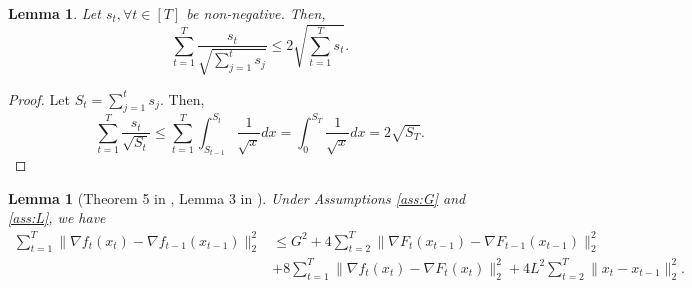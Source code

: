 \documentclass{article}
\renewcommand{\citet}{\citep}
\theoremstyle{plain}
\newtheorem{lemma}[theorem]{Lemma}
\theoremstyle{definition}
\theoremstyle{remark}
\begin{document}
\begin{lemma}\label{lem:sumetat}
Let $s_t,\forall t\in[T]$ be non-negative. Then, 
\begin{equation*}
\sum_{t=1}^T \frac{s_t}{\sqrt{\sum_{j=1}^{t}s_j}}\leq 2\sqrt{\sum_{t=1}^T s_t}.
\end{equation*}
\end{lemma}
\begin{proof}
Let $S_t=\sum_{j=1}^t s_j$. Then,
\begin{equation*}
\sum_{t=1}^T \frac{s_t}{\sqrt{S_t}}\leq \sum_{t=1}^T\int_{S_{t-1}}^{S_t}\frac{1}{\sqrt{x}}dx=\int_{0}^{S_T} \frac{1}{\sqrt{x}}dx=2\sqrt{S_T}.
\end{equation*}
\end{proof}

\begin{lemma}[{Theorem 5 in \citet{sachs2023accelerated}, Lemma 3 in \citet{chen2024optimistic}}]
\label{lem:ex2sigma}
Under Assumptions \ref{ass:G} and \ref{ass:L}, we have
\begin{align*}
\sum_{t=1}^T \|\nabla f_t(x_t)-\nabla f_{t-1}(x_{t-1})\|_2^2&\leq G^2+4\sum_{t=2}^T\|\nabla F_t(x_{t-1})-\nabla F_{t-1}(x_{t-1})\|_2^2\\
&+8\sum_{t=1}^T\|\nabla f_t(x_t)-\nabla F_t(x_{t})\|_2^2+4L^2\sum_{t=2}^T\|x_t-x_{t-1}\|_2^2.
\end{align*}
\end{lemma}
\end{document}

